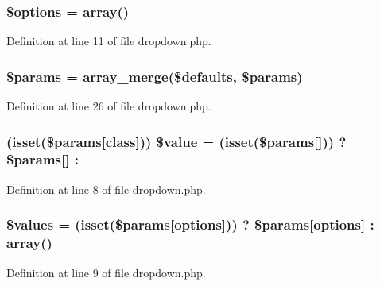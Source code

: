 \subsubsection[{\texorpdfstring{\$options}{$options}}]{\setlength{\rightskip}{0pt plus 5cm}\$options = array()}\hypertarget{dropdown_8php_a011800c63ece4cbbfa77136a20607023}{}\label{dropdown_8php_a011800c63ece4cbbfa77136a20607023}


Definition at line 11 of file dropdown.\+php.

\subsubsection[{\texorpdfstring{\$params}{$params}}]{\setlength{\rightskip}{0pt plus 5cm}\$params = array\+\_\+merge(\${\bf defaults}, \$params)}\hypertarget{dropdown_8php_afe68e6fbe7acfbffc0af0c84a1996466}{}\label{dropdown_8php_afe68e6fbe7acfbffc0af0c84a1996466}


Definition at line 26 of file dropdown.\+php.

\subsubsection[{\texorpdfstring{\$value}{$value}}]{ (isset(\$params\mbox{[}\textquotesingle{}class\textquotesingle{}\mbox{]})) \${\bf value} = (isset(\$params\mbox{[}\textquotesingle{}\mbox{]})) ? \$params\mbox{[}\textquotesingle{}\mbox{]} \+: \textquotesingle{}\textquotesingle{}}\hypertarget{dropdown_8php_a5bd63f8afd4dd4ba86dcdf5618904298}{}\label{dropdown_8php_a5bd63f8afd4dd4ba86dcdf5618904298}


Definition at line 8 of file dropdown.\+php.

\subsubsection[{\texorpdfstring{\$values}{$values}}]{\setlength{\rightskip}{0pt plus 5cm}\$values = (isset(\$params\mbox{[}\textquotesingle{}options\textquotesingle{}\mbox{]})) ? \$params\mbox{[}\textquotesingle{}options\textquotesingle{}\mbox{]} \+: array()}\hypertarget{dropdown_8php_affc45c6ace2eeb3f300b054dbf9592b6}{}\label{dropdown_8php_affc45c6ace2eeb3f300b054dbf9592b6}


Definition at line 9 of file dropdown.\+php.

